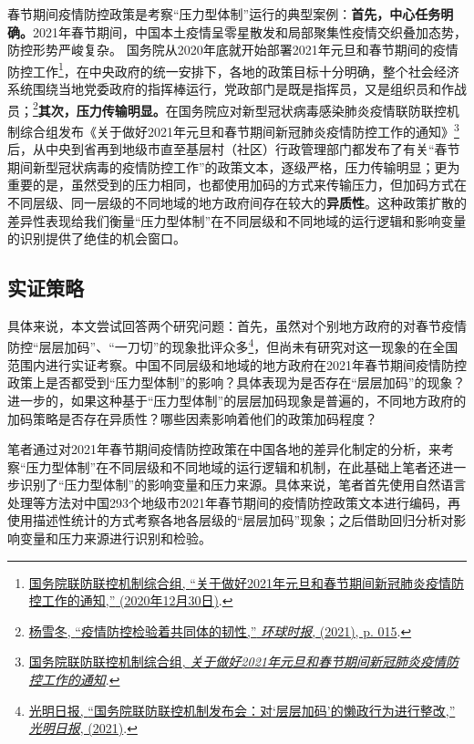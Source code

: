 \documentclass[
  12pt,
]{ctexart}
\begin{document}
春节期间疫情防控政策是考察``压力型体制''运行的典型案例：\textbf{首先，中心任务明确。}2021年春节期间，中国本土疫情呈零星散发和局部聚集性疫情交织叠加态势，防控形势严峻复杂。
国务院从2020年底就开始部署2021年元旦和春节期间的疫情防控工作\footnote{\protect\hyperlink{ref-GuoWuYuanLianFangLianKongJiZhiZongHeZu2020}{国务院联防联控机制综合组, {``关于做好2021年元旦和春节期间新冠肺炎疫情防控工作的通知,''} (2020年12月30日)}.}，在中央政府的统一安排下，各地的政策目标十分明确，整个社会经济系统围绕当地党委政府的指挥棒运行，党政部门是既是指挥员，又是组织员和作战员；\footnote{\protect\hyperlink{ref-YangXueDong2021}{杨雪冬, {``疫情防控检验着共同体的韧性,''} \emph{环球时报}, (2021), p. 015}.}\textbf{其次，压力传输明显。}在国务院应对新型冠状病毒感染肺炎疫情联防联控机制综合组发布《关于做好2021年元旦和春节期间新冠肺炎疫情防控工作的通知》\footnote{\protect\hyperlink{ref-GuoWuYuanLianFangLianKongJiZhiZongHeZu2020}{国务院联防联控机制综合组, \emph{关于做好2021年元旦和春节期间新冠肺炎疫情防控工作的通知}}.}后，从中央到省再到地级市直至基层村（社区）行政管理部门都发布了有关``春节期间新型冠状病毒的疫情防控工作''的政策文本，逐级严格，压力传输明显；更为重要的是，虽然受到的压力相同，也都使用加码的方式来传输压力，但加码方式在不同层级、同一层级的不同地域的地方政府间存在较大的\textbf{异质性}。这种政策扩散的差异性表现给我们衡量``压力型体制''在不同层级和不同地域的运行逻辑和影响变量的识别提供了绝佳的机会窗口。

\hypertarget{ux5b9eux8bc1ux7b56ux7565}{%
\subsection{实证策略}\label{ux5b9eux8bc1ux7b56ux7565}}

具体来说，本文尝试回答两个研究问题：首先，虽然对个别地方政府的对春节疫情防控``层层加码''、``一刀切''的现象批评众多\footnote{\protect\hyperlink{ref-GuangMingRiBao2021}{光明日报, {``国务院联防联控机制发布会：对{`层层加码'}的懒政行为进行整改,''} \emph{光明日报}, (2021)}.}，但尚未有研究对这一现象的在全国范围内进行实证考察。中国不同层级和地域的地方政府在2021年春节期间疫情防控政策上是否都受到``压力型体制''的影响？具体表现为是否存在``层层加码''的现象？进一步的，如果这种基于``压力型体制''的层层加码现象是普遍的，不同地方政府的加码策略是否存在异质性？哪些因素影响着他们的政策加码程度？

笔者通过对2021年春节期间疫情防控政策在中国各地的差异化制定的分析，来考察``压力型体制''在不同层级和不同地域的运行逻辑和机制，在此基础上笔者还进一步识别了``压力型体制''的影响变量和压力来源。具体来说，笔者首先使用自然语言处理等方法对中国293个地级市2021年春节期间的疫情防控政策文本进行编码，再使用描述性统计的方式考察各地各层级的``层层加码''现象；之后借助回归分析对影响变量和压力来源进行识别和检验。
\end{document}
